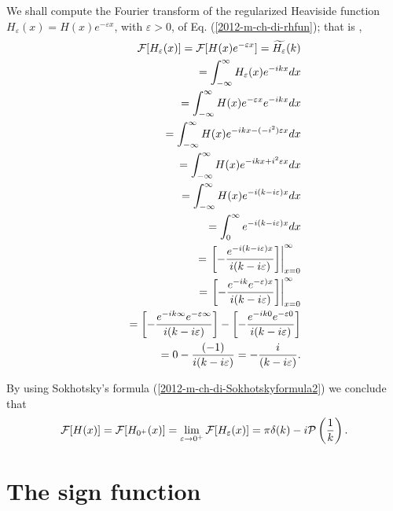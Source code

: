 {\color{OliveGreen}
\bproof
We shall compute the Fourier transform of the regularized Heaviside function
$H_\varepsilon (x) =H(x)e^{-\varepsilon x}$, with $\varepsilon >0$, of Eq. (\ref{2012-m-ch-di-rhfun}); that is  \cite{sommer-di},
\begin{equation}
\begin{split}
 {\cal F}[H_\varepsilon (x)] =
 {\cal F}[H(x)e^{-\varepsilon x}]
=\widetilde{H_\varepsilon }(k)
\\ \qquad
=   \int_{-\infty}^\infty  H_\varepsilon (x) e^{-i{kx}} dx
\\ \qquad
=   \int_{-\infty}^\infty  H(x)e^{-\varepsilon x}  e^{-i{kx}} dx
\\ \qquad
=   \int_{-\infty}^\infty  H(x) e^{-i{kx}-(-i^2)\varepsilon x}  dx
\\ \qquad
=   \int_{-\infty}^\infty  H(x) e^{-i{kx}+ i^2 \varepsilon x}  dx
\\ \qquad
=   \int_{-\infty}^\infty  H(x) e^{-i(k - i \varepsilon ) x}  dx
\\ \qquad
=   \int_{0}^\infty  e^{-i(k - i \varepsilon ) x}  dx
\\ \qquad
=  \left. \left[ -\frac{ e^{-i(k - i \varepsilon ) x}}{i(k - i \varepsilon ) } \right] \right|_{x=0}^{\infty}
\\ \qquad
=  \left. \left[ -\frac{ e^{-ik} e^{- \varepsilon ) x}}{i(k - i \varepsilon ) } \right] \right|_{x=0}^{\infty}
\\ \qquad
=  \left[ -\frac{ e^{-ik\infty} e^{- \varepsilon  \infty}}{i(k - i \varepsilon ) } \right]
-  \left[ -\frac{ e^{-ik0} e^{- \varepsilon  0}}{i(k - i \varepsilon ) } \right]
\\ \qquad
=    0 - \frac{ (-1)}{i(k - i \varepsilon ) }
=     -\frac{ i}{(k - i \varepsilon ) }
.
\end{split}
\end{equation}

By using Sokhotsky's  formula
(\ref{2012-m-ch-di-Sokhotskyformula2})
we conclude that
\begin{equation}
 {\cal F}[H(x)] =
 {\cal F}[H_{0^+} (x)] =
 \lim_{\varepsilon \rightarrow 0^+} {\cal F}[H_\varepsilon (x)] =
  \pi \delta (k)   -i {\cal P} \left(\frac{1}{k}\right)
.
\label{2012-m-ch-di-fthfu}
\end{equation}

\eproof
}




\section{The sign function}

